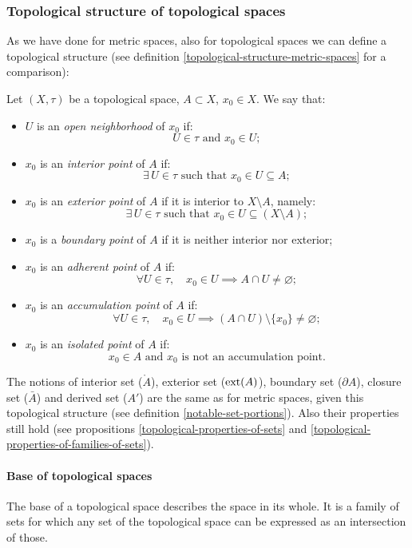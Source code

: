 \subsubsection{Topological structure of topological spaces}

As we have done for metric spaces, also for topological spaces we can define a topological structure (see definition \vref{topological-structure-metric-spaces} for a comparison):
\begin{defn}\label{topological-structure-topological-spaces}
	Let $(X, \tau)$ be a topological space, $A \subset X$, $x_0 \in X$. We say that:
	\begin{itemize}
		\item $U$ is an \emph{open neighborhood} of $x_0$ if: 		
		$$U \in \tau\text{ and }x_0 \in U;$$
		\item $x_0$ is an \emph{interior point} of $A$ if: 			
		$$\exists \, U \in \tau\text{ such that }x_0 \in U \subseteq A;$$
		\item $x_0$ is an \emph{exterior point} of $A$ if it is interior to $X \setminus A$, namely:
		$$\exists \, U \in \tau\text{ such that }x_0 \in U \subseteq (X \setminus A);$$
		\item $x_0$ is a \emph{boundary point} of $A$ if it is neither interior nor exterior;
		\item $x_0$ is an \emph{adherent point} of $A$ if: 	
			$$
				 \forall U \in \tau, 
				 \quad  x_0 \in U 
				 \implies A \cap U \neq \varnothing
			;
			$$
		\item $x_0$ is an \emph{accumulation point} of $A$ if: 		
			$$
				\forall U \in \tau,
				\quad x_0 \in U
				\implies (A \cap U) \setminus \{ x_0 \} \neq \varnothing
			;
			$$
		\item $x_0$ is an \emph{isolated point} of $A$ if: 			
		$$x_0 \in A\text{ and }x_0\text{ is not an accumulation point}.$$
	\end{itemize}
\end{defn}

The notions of interior set ($\mathring{A}$), exterior set ($\operatorname{ext}(A)$), boundary set ($\partial A$), closure set ($\bar{A}$) and derived set ($A'$) are the same as for metric spaces, given this topological structure (see definition \vref{notable-set-portions}). Also their properties still hold (see propositions \vref{topological-properties-of-sets} and \vref{topological-properties-of-families-of-sets}).


\paragraph{Base of topological spaces} The base of a topological space describes the space in its whole. It is a family of sets for which any set of the topological space can be expressed as an intersection of those.

